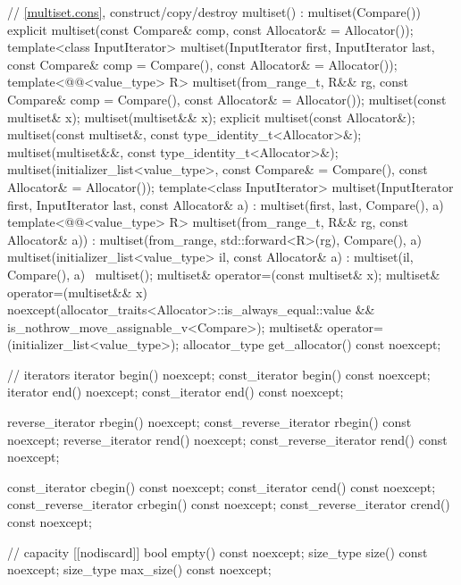 \begin{codeblock}
{{    // \ref{multiset.cons}, construct/copy/destroy
    multiset() : multiset(Compare()) { }
    explicit multiset(const Compare& comp, const Allocator& = Allocator());
    template<class InputIterator>
      multiset(InputIterator first, InputIterator last,
               const Compare& comp = Compare(), const Allocator& = Allocator());
    template<@@<value_type> R>
      multiset(from_range_t, R&& rg,
               const Compare& comp = Compare(), const Allocator& = Allocator());
    multiset(const multiset& x);
    multiset(multiset&& x);
    explicit multiset(const Allocator&);
    multiset(const multiset&, const type_identity_t<Allocator>&);
    multiset(multiset&&, const type_identity_t<Allocator>&);
    multiset(initializer_list<value_type>, const Compare& = Compare(),
             const Allocator& = Allocator());
    template<class InputIterator>
      multiset(InputIterator first, InputIterator last, const Allocator& a)
        : multiset(first, last, Compare(), a) { }
    template<@@<value_type> R>
      multiset(from_range_t, R&& rg, const Allocator& a))
        : multiset(from_range, std::forward<R>(rg), Compare(), a) { }
    multiset(initializer_list<value_type> il, const Allocator& a)
      : multiset(il, Compare(), a) { }
    ~multiset();
    multiset& operator=(const multiset& x);
    multiset& operator=(multiset&& x)
      noexcept(allocator_traits<Allocator>::is_always_equal::value &&
               is_nothrow_move_assignable_v<Compare>);
    multiset& operator=(initializer_list<value_type>);
    allocator_type get_allocator() const noexcept;

    // iterators
    iterator               begin() noexcept;
    const_iterator         begin() const noexcept;
    iterator               end() noexcept;
    const_iterator         end() const noexcept;

    reverse_iterator       rbegin() noexcept;
    const_reverse_iterator rbegin() const noexcept;
    reverse_iterator       rend() noexcept;
    const_reverse_iterator rend() const noexcept;

    const_iterator         cbegin() const noexcept;
    const_iterator         cend() const noexcept;
    const_reverse_iterator crbegin() const noexcept;
    const_reverse_iterator crend() const noexcept;

    // capacity
    [[nodiscard]] bool empty() const noexcept;
    size_type size() const noexcept;
    size_type max_size() const noexcept;

}}
\end{codeblock}
